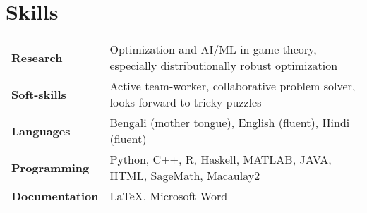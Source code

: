 \section{Skills}

\begin{tabular*}{\textwidth}{l @{\hskip 0.5in} l}
\textbf{Research} & Optimization and AI/ML in game theory, especially distributionally robust optimization\\
\textbf{Soft-skills} & Active team-worker, collaborative problem solver, looks forward to tricky puzzles\\
\textbf{Languages} & Bengali (mother tongue), English (fluent), Hindi (fluent)\\
\textbf{Programming}  & {Python, C++, R, Haskell,  MATLAB, JAVA, HTML, SageMath, Macaulay2} \\
\textbf {Documentation} & {\LaTeX, Microsoft Word} \\
\end{tabular*}









